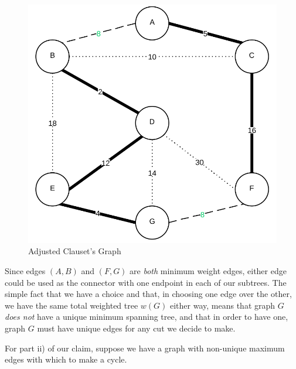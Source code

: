\documentclass[10pt]{article}\usepackage[]{graphicx}\usepackage[]{xcolor}
\begin{document}
\begin{easylist}[enumerate]
    \begin{figure}[H]
        \centering
        \includegraphics[scale=0.5]{./img/ps8/3cb.png}
        \caption{Adjusted Clauset's Graph}
        \label{fig:3bb}
    \end{figure}

    Since edges $(A, B)$ and $(F, G)$ are \textit{both} minimum weight edges, either edge could be used as the connector
    with one endpoint in each of our subtrees. The simple fact that we have a choice and that, in choosing one edge over
    the other, we have the same total weighted tree $w(G)$ either way, means that graph $G$ \textit{does not} have a
    unique minimum spanning tree, and that in order to have one, graph $G$ must have unique edges for any cut we decide
    to make.\newline

    For part ii) of our claim, suppose we have a graph with non-unique maximum edges with which to make a cycle.


\end{easylist}
\end{document}
